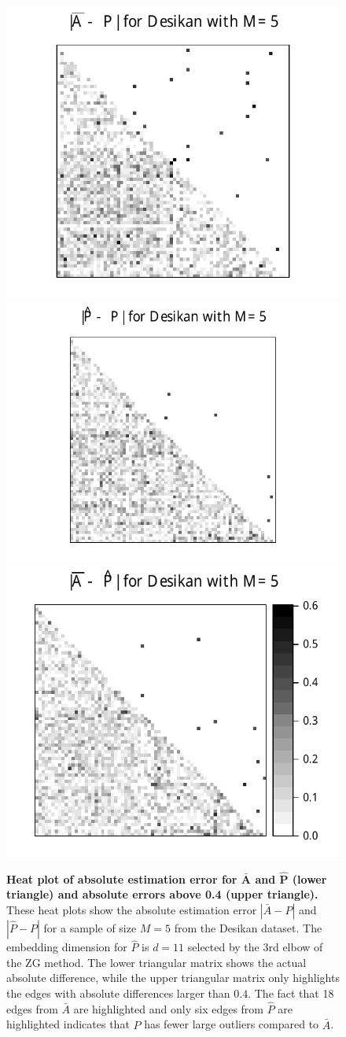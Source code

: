 \documentclass[10pt,letterpaper]{article}
\renewcommand{\hat}{\widehat}
\begin{document}
\begin{figure}

\begin{center}
  \includegraphics[height=.33\linewidth]{Diff2_desikan_m5.pdf}\hspace{-40pt}
  \includegraphics[height=.33\linewidth]{Diff3_desikan_m5.pdf}\hspace{-32pt}
  \includegraphics[height=.33\linewidth]{Diff1_desikan_m5.pdf}
\end{center}

\caption{{\bf Heat plot of absolute estimation error for $\bm{\bar{A}}$ and $\bm{\hat{P}}$ (lower triangle) and absolute errors above 0.4 (upper triangle).}
These heat plots show the absolute estimation error $|\bar{A} - P|$ and $|\hat{P} - P|$ for a sample of size $M=5$ from the Desikan dataset.
The embedding dimension for $\hat{P}$ is $d=11$ selected by the 3rd elbow of the ZG method. The lower triangular matrix shows the actual absolute difference, while the upper triangular matrix only highlights the edges with absolute differences larger than $0.4$. The fact that 18 edges from $\bar{A}$ are highlighted and only six edges from $\hat{P}$ are highlighted indicates that $\hat{P}$ has fewer large outliers compared to $\bar{A}$.
}
\label{fig:Diff_desikan_m5}
\end{figure}
\end{document}
